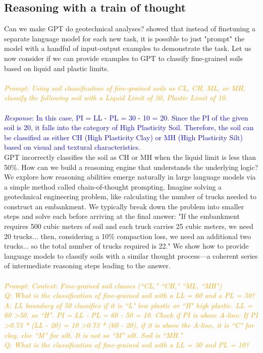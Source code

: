 \documentclass{article}
\begin{document}
\subsection{Reasoning with a train of thought}
Can we make GPT do geotechnical analyses? \citet{wei2022chain} showed that instead of finetuning a separate language model for each new task, it is possible to just "prompt" the model with a handful of input-output examples to demonstrate the task. Let us now consider if we can provide examples to GPT to classify fine-grained soils based on liquid and plastic limits.
\\\\
\textit{\textcolor{orange}{Prompt: Using soil classification of fine-grained soils as CL, CH, ML, or MH, classify the following soil with a Liquid Limit of 30, Plastic Limit of 10. }}
\\\\
\textcolor{blue}{\textit{Response}: In this case, PI = LL - PL = 30 - 10 = 20. Since the PI of the given soil is 20, it falls into the category of High Plasticity Soil. Therefore, the soil can be classified as either CH (High Plasticity Clay) or MH (High Plasticity Silt) based on visual and textural characteristics.}
\\GPT incorrectly classifies the soil as CH or MH when the liquid limit is less than 50\%. How can we build a reasoning engine that understands the underlying logic? We explore how reasoning abilities emerge naturally in large language models via a simple method called chain-of-thought prompting. Imagine solving a geotechnical engineering problem, like calculating the number of trucks needed to construct an embankment. We typically break down the problem into smaller steps and solve each before arriving at the final answer: "If the embankment requires 500 cubic meters of soil and each truck carries 25 cubic meters, we need 20 trucks... then, considering a 10\% compaction loss, we need an additional two trucks... so the total number of trucks required is 22." We show how to provide language models to classify soils with a similar thought process—a coherent series of intermediate reasoning steps leading to the answer. 
\\\\
\textit{\textcolor{orange}{Prompt: Context: Fine-grained soil classes (``CL," ``CH," ``ML, ``MH")
\\Q: What is the classification of fine-grained soil with a LL = 60 and a PL = 50? 
\\A: LL boundary of 50 classifies if it is ``L" low plastic or ``H" high plastic. LL = 60 \textgreater 50, so ``H". PI = LL - PL = 60 - 50 = 10. Check if PI is above A-line: If PI \textgreater 0.73 * (LL - 20) = 10 \textgreater 0.73 * (60 - 20), if it is above the A-line, it is ``C" for clay, else ``M" for silt. It is not so ``M" silt. Soil is ``MH." 
\\Q: What is the classification of fine-grained soil with a LL = 30 and PL = 10?
}}
\end{document}

